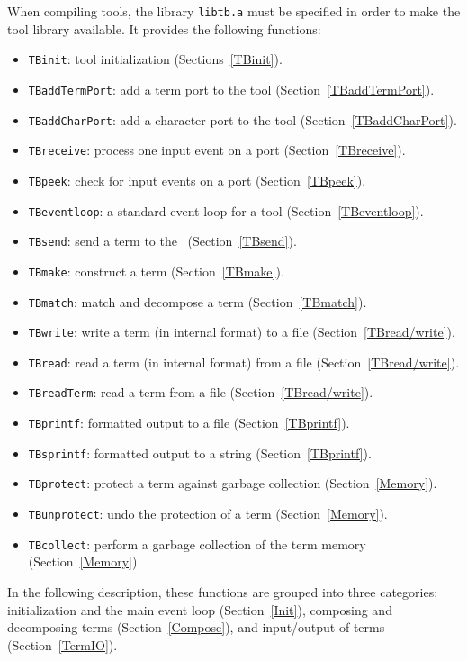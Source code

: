 \documentclass[a4,twoside,noweb]{article} %
\begin{document}
When compiling tools, the library {\tt libtb.a} must be specified
in order to make the tool library available. It provides the following functions:

\begin{itemize}
\item {\tt TBinit}: tool initialization (Sections~\ref{TBinit}).
\item {\tt TBaddTermPort}: add a term port to the tool (Section~\ref{TBaddTermPort}).
\item {\tt TBaddCharPort}: add a character port to the tool (Section~\ref{TBaddCharPort}).
\item {\tt TBreceive}: process one input event on a port (Section~\ref{TBreceive}).
\item {\tt TBpeek}: check for input events on a port (Section~\ref{TBpeek}).
\item {\tt TBeventloop}: a standard event loop for a tool (Section~\ref{TBeventloop}).
\item {\tt TBsend}: send a term to the \TB\ (Section~\ref{TBsend}).
\item {\tt TBmake}: construct a term (Section~\ref{TBmake}).
\item {\tt TBmatch}: match and decompose a term (Section~\ref{TBmatch}).
\item {\tt TBwrite}: write a term (in internal format) to a file (Section~\ref{TBread/write}).
\item {\tt TBread}: read a term (in internal format) from a file (Section~\ref{TBread/write}).
\item {\tt TBreadTerm}: read a term from a file (Section~\ref{TBread/write}).
\item {\tt TBprintf}: formatted output to a file (Section~\ref{TBprintf}).
\item {\tt TBsprintf}: formatted output to a string (Section~\ref{TBprintf}).
\item {\tt TBprotect}: protect a term against garbage collection (Section~\ref{Memory}).
\item {\tt TBunprotect}: undo the protection of a term (Section~\ref{Memory}).
\item {\tt TBcollect}: perform a garbage collection of the term memory (Section~\ref{Memory}).


\end{itemize}

In the following description, these functions are grouped into three categories:
initialization and the main event loop (Section~\ref{Init}),
composing and decomposing terms (Section~\ref{Compose}),
and input/output of terms (Section~\ref{TermIO}).
\end{document}

